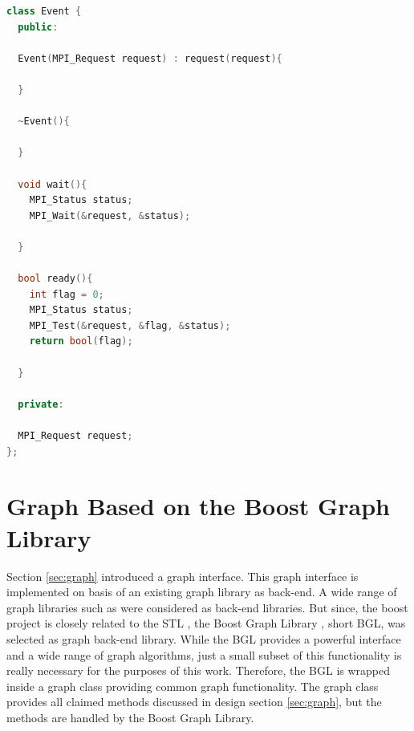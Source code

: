 \begin{lstlisting}[language=C++, label=lst:mpi_event]
class Event {
  public:

  Event(MPI_Request request) : request(request){
    
  }
  
  ~Event(){
    
  }

  void wait(){
    MPI_Status status;
    MPI_Wait(&request, &status);
    
  }

  bool ready(){
    int flag = 0;
    MPI_Status status;
    MPI_Test(&request, &flag, &status);
    return bool(flag);
    
  }
  
  private:
  
  MPI_Request request;
};  
\end{lstlisting}

\section{Graph Based on the Boost Graph Library}
Section \ref{sec:graph} introduced a graph interface.  This graph
interface is implemented on basis of an existing graph library as
back-end. A wide range of graph libraries such as \cite{ref:lemon,
  ref:boost_bgl, ref:igraph, ref:ogdf} were considered as back-end
libraries.  But since, the boost project is closely related to the STL
, the Boost Graph Library \cite{ref:boost_bgl}, short BGL, was
selected as graph back-end library.  While the BGL provides a powerful
interface and a wide range of graph algorithms, just a small subset of
this functionality is really necessary for the purposes of this
work. Therefore, the BGL is wrapped inside a graph class providing
common graph functionality.  The graph class provides all claimed
methods discussed in design section \ref{sec:graph}, but the methods
are handled by the Boost Graph Library.


